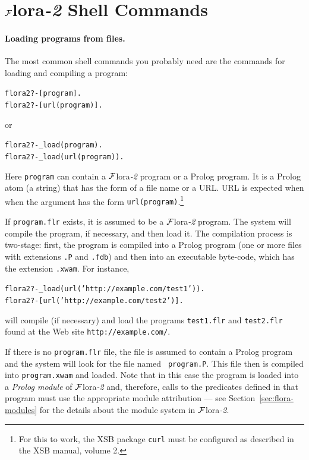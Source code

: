 \documentclass[11pt]{article}
\newcommand{\FLORA}{{\mbox{\sc ${\cal F}${lora}\rm\emph{-2}}}\xspace}
\newcommand{\ofile}{xwam}
\begin{document}
\section{\FLORA Shell Commands} \label{sec-shell-commands}

\paragraph{Loading programs from files.}
The most common shell commands you probably need are the commands for
loading and compiling a program:
\begin{alltt}
  flora2 ?-  [program].
  flora2 ?-  [url(program)].
\end{alltt}
or 
\begin{alltt}
  flora2 ?- _load(program).
  flora2 ?- _load(url(program)).
\end{alltt}
Here {\tt program} can contain a \FLORA program or a Prolog program.
It is a Prolog  atom (a string) that has the form of a file name or a
URL. URL is expected when
when the argument has the form {\tt url(program)}.\footnote{
  For this to work, the XSB package {\tt curl} must be configured as
  described in the XSB manual, volume 2. 
  }

If {\tt program.flr} exists, it is assumed to be a \FLORA program. The
system will compile the program, if necessary, and then load it. The
compilation process is two-stage: first, the program is compiled into a
Prolog program (one or more files with extensions {\tt .P} and {\tt .fdb})
and then into an executable byte-code, which has the extension {\tt .\ofile}.
For instance, 
\begin{alltt}
  flora2 ?- _load(url('http://example.com/test1')).
  flora2 ?- [url('http://example.com/test2')].
\end{alltt}
will compile (if necessary) and load the programs {\tt test1.flr} and
{\tt test2.flr} found at the Web site {\tt http://example.com/}.   

If there is no {\tt program.flr} file, the file is assumed to contain
a Prolog program and the system will look for the file named {\tt
  program.P}. This file then is compiled into {\tt program.\ofile} and
loaded. Note that in this case the program is loaded into a {\em Prolog
  module} of \FLORA and, therefore, calls to the predicates defined in that
program must use the appropriate module attribution --- see
Section~\ref{sec:flora-modules} for the details about the module system in
\FLORA.
\end{document}

